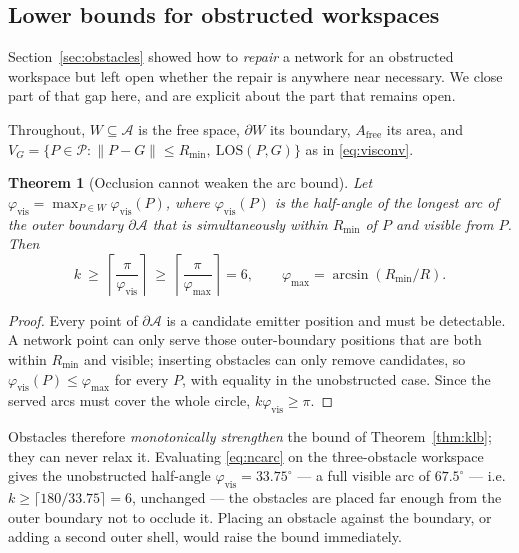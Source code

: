 \documentclass[preprint,12pt,3p]{elsarticle}
\newtheorem{theorem}{Theorem}
\theoremstyle{definition}
\newenvironment{bproof}{\begin{proof}}{\end{proof}}
\newcommand{\Rmin}{R_{\min}}
\newcommand{\bA}{\mathcal{A}}
\newcommand{\bP}{\mathcal{P}}
\begin{document}
\subsection{Lower bounds for obstructed workspaces}
\label{sec:ncbounds}

Section~\ref{sec:obstacles} showed how to \emph{repair} a network for an obstructed workspace but
left open whether the repair is anywhere near necessary. We close part of that gap here, and are
explicit about the part that remains open.

Throughout, $W\subseteq\bA$ is the free space, $\partial W$ its boundary, $A_{\mathrm{free}}$ its
area, and $V_G=\{P\in\bP:\|P-G\|\le\Rmin,\ \mathrm{LOS}(P,G)\}$ as in \eqref{eq:visconv}.

\begin{theorem}[Occlusion cannot weaken the arc bound]
\label{thm:ncarc}
Let $\varphi_{\mathrm{vis}}=\max_{P\in W}\varphi_{\mathrm{vis}}(P)$, where
$\varphi_{\mathrm{vis}}(P)$ is the half-angle of the longest arc of the outer boundary
$\partial\bA$ that is simultaneously within $\Rmin$ of $P$ and visible from $P$. Then
\begin{equation}
k\ \ge\ \left\lceil\frac{\pi}{\varphi_{\mathrm{vis}}}\right\rceil
\ \ge\ \left\lceil\frac{\pi}{\varphi_{\max}}\right\rceil=6,
\qquad \varphi_{\max}=\arcsin(\Rmin/R).
\label{eq:ncarc}
\end{equation}
\end{theorem}
\begin{bproof}
Every point of $\partial\bA$ is a candidate emitter position and must be detectable. A network
point can only serve those outer-boundary positions that are both within $\Rmin$ and visible;
inserting obstacles can only remove candidates, so $\varphi_{\mathrm{vis}}(P)\le\varphi_{\max}$
for every $P$, with equality in the unobstructed case. Since the served arcs must cover the whole
circle, $k\varphi_{\mathrm{vis}}\ge\pi$.
\end{bproof}

Obstacles therefore \emph{monotonically strengthen} the bound of Theorem~\ref{thm:klb}; they can
never relax it. Evaluating \eqref{eq:ncarc} on the three-obstacle workspace gives the unobstructed
half-angle $\varphi_{\mathrm{vis}}=33.75^\circ$ --- a full visible arc of $67.5^\circ$ ---
i.e. $k\ge\lceil180/33.75\rceil=6$, unchanged --- the obstacles are placed far
enough from the outer boundary not to occlude it. Placing an obstacle against the boundary, or
adding a second outer shell, would raise the bound immediately.
\end{document}
